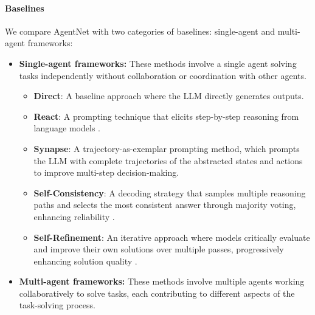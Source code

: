 \documentclass{article}
\begin{document}
\paragraph{Baselines}
We compare AgentNet with two categories of baselines: single-agent and multi-agent frameworks:\vspace{-0.2cm}
\begin{itemize}
    \item \textbf{Single-agent frameworks:}
    These methods involve a single agent solving tasks independently without collaboration or coordination with other agents.
    \begin{itemize}
        \item \textbf{Direct}: A baseline approach where the LLM directly generates outputs.
        \item \textbf{React}: A prompting technique that elicits step-by-step reasoning from language models \cite{wei2023chainofthoughtpromptingelicitsreasoning, yao2023reactsynergizingreasoningacting}.
        \item \textbf{Synapse}: A trajectory-as-exemplar prompting method, which prompts the LLM with complete trajectories of the abstracted states and actions to improve multi-step decision-making. \cite{zheng2024synapsetrajectoryasexemplarpromptingmemory}
        \item \textbf{Self-Consistency}: A decoding strategy that samples multiple reasoning paths and selects the most consistent answer through majority voting, enhancing reliability \cite{wang2023selfconsistencyimproveschainthought}.
        \item \textbf{Self-Refinement}: An iterative approach where models critically evaluate and improve their own solutions over multiple passes, progressively enhancing solution quality \cite{madaan2023selfrefineiterativerefinementselffeedback}.
    \end{itemize}
    \item \textbf{Multi-agent frameworks:}
    These methods involve multiple agents working collaboratively to solve tasks, each contributing to different aspects of the task-solving process.


\end{itemize}
\end{document}

